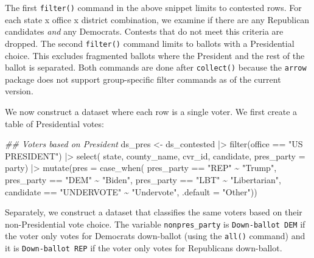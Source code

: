 \documentclass[fleqn,10pt]{wlscirep}
\newenvironment{Shaded}{\begin{snugshade}}{\end{snugshade}}
\newcommand{\AttributeTok}[1]{\textcolor[rgb]{0.40,0.45,0.13}{#1}}
\newcommand{\DocumentationTok}[1]{\textcolor[rgb]{0.37,0.37,0.37}{\textit{#1}}}
\newcommand{\FunctionTok}[1]{\textcolor[rgb]{0.28,0.35,0.67}{#1}}
\newcommand{\NormalTok}[1]{\textcolor[rgb]{0.00,0.23,0.31}{#1}}
\newcommand{\OtherTok}[1]{\textcolor[rgb]{0.00,0.23,0.31}{#1}}
\newcommand{\SpecialCharTok}[1]{\textcolor[rgb]{0.37,0.37,0.37}{#1}}
\newcommand{\StringTok}[1]{\textcolor[rgb]{0.13,0.47,0.30}{#1}}
\begin{document}
The first \texttt{filter()} command in the above snippet limits to
contested rows. For each state x office x district combination, we
examine if there are any Republican candidates \emph{and} any Democrats.
Contests that do not meet this criteria are dropped. The second
\texttt{filter()} command limits to ballots with a Presidential choice.
This excludes fragmented ballots where the President and the rest of the
ballot is separated. Both commands are done after \texttt{collect()}
because the \texttt{arrow} package does not support group-specific
filter commands as of the current version.

\noindent We now construct a dataset where each row is a single voter.
We first create a table of Presidential votes:

\begin{Shaded}
\begin{Highlighting}[]
\DocumentationTok{\#\# Voters based on President}
\NormalTok{ds\_pres }\OtherTok{\textless{}{-}}\NormalTok{ ds\_contested }\SpecialCharTok{|\textgreater{}} 
  \FunctionTok{filter}\NormalTok{(office }\SpecialCharTok{==} \StringTok{"US PRESIDENT"}\NormalTok{) }\SpecialCharTok{|\textgreater{}} 
  \FunctionTok{select}\NormalTok{(}
\NormalTok{    state, county\_name, }
\NormalTok{    cvr\_id, candidate,}
    \AttributeTok{pres\_party =}\NormalTok{ party) }\SpecialCharTok{|\textgreater{}} 
  \FunctionTok{mutate}\NormalTok{(}\AttributeTok{pres =} \FunctionTok{case\_when}\NormalTok{(}
\NormalTok{    pres\_party }\SpecialCharTok{==} \StringTok{"REP"} \SpecialCharTok{\textasciitilde{}} \StringTok{"Trump"}\NormalTok{, }
\NormalTok{    pres\_party }\SpecialCharTok{==} \StringTok{"DEM"} \SpecialCharTok{\textasciitilde{}} \StringTok{"Biden"}\NormalTok{, }
\NormalTok{    pres\_party }\SpecialCharTok{==} \StringTok{"LBT"} \SpecialCharTok{\textasciitilde{}} \StringTok{"Libertarian"}\NormalTok{, }
\NormalTok{    candidate }\SpecialCharTok{==} \StringTok{"UNDERVOTE"} \SpecialCharTok{\textasciitilde{}} \StringTok{"Undervote"}\NormalTok{,}
    \AttributeTok{.default =} \StringTok{"Other"}\NormalTok{))}
\end{Highlighting}
\end{Shaded}

Separately, we construct a dataset that classifies the same voters based
on their non-Presidential vote choice. The variable
\texttt{nonpres\_party} is \texttt{Down-ballot\ DEM} if the voter only
votes for Democrats down-ballot (using the \texttt{all()} command) and
it is \texttt{Down-ballot\ REP} if the voter only votes for Republicans
down-ballot.
\end{document}
